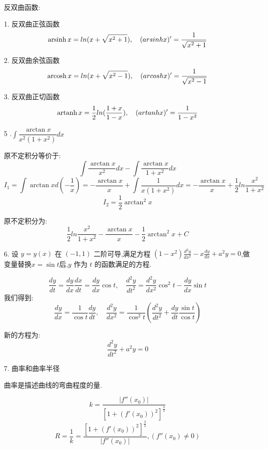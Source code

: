 \begin{definition}
	反双曲函数:  
	
	1. 反双曲正弦函数
	$$\operatorname{arsinh} x=ln(x+\sqrt{x^2+1}),\quad (arsinh x)'=\frac{1}{\sqrt{x^2+1}}$$
	
	2. 反双曲余弦函数
	$$\operatorname{arcosh} x=ln(x+\sqrt{x^2-1}),\quad (arcosh x)'=\frac{1}{\sqrt{x^2-1}}$$
	
	3. 反双曲正切函数
	$$\operatorname{artanh} x=\frac{1}{2}ln(\frac{1+x}{1-x}),\quad (artanh x)'=\frac{1}{1-x^2}$$
\end{definition}
5 .$\int\dfrac{\arctan x}{x^2(1+x^2)}dx$
\begin{solution}
	
	原不定积分等价于:  
	$$\int\dfrac{\arctan x}{x^2}dx-\int\frac{\arctan x}{1+x^2}dx$$
	$$I_{1}=\int\arctan xd(-\frac{1}{x})=-\frac{\arctan x}{x}+\int\frac{1}{x(1+x^2)}dx=-\frac{\arctan x}{x}+\frac{1}{2}ln\frac{x^2}{1+x^2}$$
	$$I_{2}=\frac{1}{2}\arctan^{2}x$$
	
	原不定积分为:  $$\frac{1}{2}ln\frac{x^2}{1+x^2}-\frac{\arctan x}{x}-\frac{1}{2}\arctan^{2}x+C$$
\end{solution}
6. 设 $y=y(x)$ 在 $(-1,1)$ 二阶可导,满足方程 $(1-x^2)\frac{d^2 y}{d x^2}-x\frac{dy}{dx}+a^2y=0$,做变量替换$x=\sin t$后,$y$ 作为 $t$ 的函数满足的方程.
\begin{solution}
	
	$$\frac{dy}{dt}=\frac{dy}{dx}\frac{dx}{dt}=\frac{dy}{dx}\cos t,\quad \frac{d^2y}{dt^2}=\frac{d^2y}{dx^2}\cos^2 t-\frac{dy}{dx}\sin t $$
	我们得到:  
	$$\frac{dy}{dx}=\frac{1}{\cos t}\frac{dy}{dt},\quad \frac{d^2y}{dx^2}=\frac{1}{\cos^2 t}(\frac{d^2y}{dt^2}+\frac{dy}{dt}\frac{\sin t}{\cos t})$$
	
	新的方程为:  
	$$\frac{d^2y}{dt^2}+a^2y=0$$
\end{solution}

7. 曲率和曲率半径
\begin{definition}
	曲率是描述曲线的弯曲程度的量.
	
	$$k=\dfrac{|f''(x_{0})|}{[1+(f'(x_{0}))^{2}]^{\frac{3}{2}}}$$
	$$R=\dfrac{1}{k}=\dfrac{[1+(f'(x_{0}))^{2}]^{\frac{3}{2}}}{|f''(x_{0})|},(f''(x_{0})\neq 0)$$
	
\end{definition}

